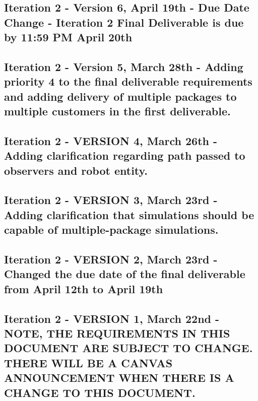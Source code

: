 \subsection*{Iteration 2 -\/ Version 6, April 19th -\/ Due Date Change -\/ Iteration 2 Final Deliverable is due by 11\+:59 PM April 20th}

\subsection*{Iteration 2 -\/ Version 5, March 28th -\/ Adding priority 4 to the final deliverable requirements and adding delivery of multiple packages to multiple customers in the first deliverable.}

\subsection*{Iteration 2 -\/ V\+E\+R\+S\+I\+ON 4, March 26th -\/ Adding clarification regarding path passed to observers and robot entity.}

\subsection*{Iteration 2 -\/ V\+E\+R\+S\+I\+ON 3, March 23rd -\/ Adding clarification that simulations should be capable of multiple-\/package simulations.}

\subsection*{Iteration 2 -\/ V\+E\+R\+S\+I\+ON 2, March 23rd -\/ {\bfseries Changed the due date of the final deliverable from April 12th to April 19th}}

\subsection*{Iteration 2 -\/ V\+E\+R\+S\+I\+ON 1, March 22nd -\/ {\bfseries N\+O\+TE, T\+HE R\+E\+Q\+U\+I\+R\+E\+M\+E\+N\+TS IN T\+H\+IS D\+O\+C\+U\+M\+E\+NT A\+RE S\+U\+B\+J\+E\+CT TO C\+H\+A\+N\+GE. T\+H\+E\+RE W\+I\+LL BE A C\+A\+N\+V\+AS A\+N\+N\+O\+U\+N\+C\+E\+M\+E\+NT W\+H\+EN T\+H\+E\+RE IS A C\+H\+A\+N\+GE TO T\+H\+IS D\+O\+C\+U\+M\+E\+NT.}}

